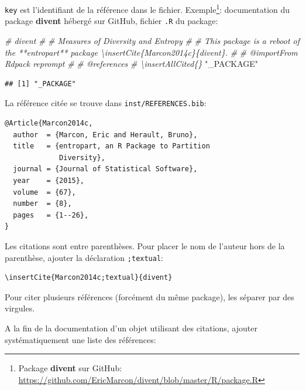 \documentclass[
  12pt,
  french,
  a4paper,
  extrafontsizes,onecolumn,openright
  ]{memoir}
\newenvironment{Shaded}{\begin{snugshade}}{\end{snugshade}}
\newcommand{\CommentTok}[1]{\textcolor[rgb]{0.56,0.35,0.01}{\textit{#1}}}
\newcommand{\StringTok}[1]{\textcolor[rgb]{0.31,0.60,0.02}{#1}}
\begin{document}
\texttt{key} est l'identifiant de la référence dans le fichier.
Exemple\footnote{Package \textbf{divent} sur GitHub: \url{https://github.com/EricMarcon/divent/blob/master/R/package.R}}: documentation du package \textbf{divent} hébergé sur GitHub, fichier \texttt{.R} du package:

\scriptsize

\begin{Shaded}
\begin{Highlighting}[]
\CommentTok{\#\textquotesingle{} divent}
\CommentTok{\#\textquotesingle{}}
\CommentTok{\#\textquotesingle{} Measures of Diversity and Entropy}
\CommentTok{\#\textquotesingle{} }
\CommentTok{\#\textquotesingle{} This package is a reboot of the **entropart** package \textbackslash{}insertCite\{Marcon2014c\}\{divent\}.}
\CommentTok{\#\textquotesingle{}}
\CommentTok{\#\textquotesingle{} @importFrom Rdpack reprompt}
\CommentTok{\#\textquotesingle{} }
\CommentTok{\#\textquotesingle{} @references}
\CommentTok{\#\textquotesingle{} \textbackslash{}insertAllCited\{\}}
\StringTok{"\_PACKAGE"}
\end{Highlighting}
\end{Shaded}

\begin{verbatim}
## [1] "_PACKAGE"
\end{verbatim}

\normalsize

La référence citée se trouve dans \texttt{inst/REFERENCES.bib}:

\begin{verbatim}
@Article{Marcon2014c,
  author  = {Marcon, Eric and Herault, Bruno},
  title   = {entropart, an R Package to Partition 
             Diversity},
  journal = {Journal of Statistical Software},
  year    = {2015},
  volume  = {67},
  number  = {8},
  pages   = {1--26},
}
\end{verbatim}

Les citations sont entre parenthèses.
Pour placer le nom de l'auteur hors de la parenthèse, ajouter la déclaration \texttt{;textual}:

\begin{verbatim}
\insertCite{Marcon2014c;textual}{divent}
\end{verbatim}

Pour citer plusieurs références (forcément du même package), les séparer par des virgules.

A la fin de la documentation d'un objet utilisant des citations, ajouter systématiquement une liste des références:
\end{document}
